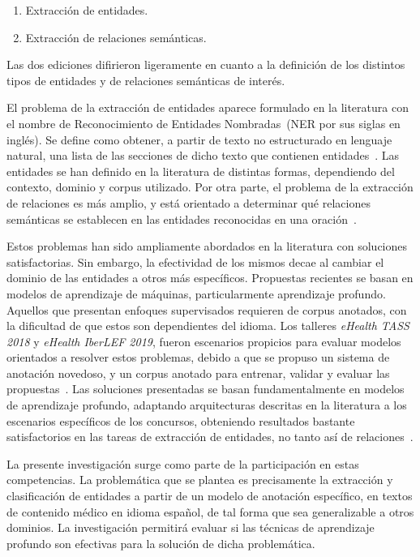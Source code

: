 \begin{enumerate}
	\item Extracción de entidades.
	\item Extracción de relaciones semánticas.
\end{enumerate}

Las dos ediciones difirieron ligeramente en cuanto a la definición de los distintos tipos de entidades y de relaciones semánticas de interés.

El problema de la extracción de entidades aparece formulado en la literatura con el nombre de Reconocimiento de Entidades Nombradas~(NER por sus siglas en inglés).
Se define como obtener, a partir de texto no estructurado en lenguaje natural, una lista de las secciones de dicho texto que contienen entidades~\cite{ehealthkd19_overview, nadeau2007survey}.
Las entidades se han definido en la literatura de distintas formas, dependiendo del contexto, dominio y corpus utilizado.
Por otra parte, el problema de la extracción de relaciones es más amplio, y está orientado a determinar qué relaciones semánticas se establecen en las entidades reconocidas en una oración~\cite{ehealthkd19_overview, kumar2017survey}.

Estos problemas han sido ampliamente abordados en la literatura con soluciones satisfactorias.
Sin embargo, la efectividad de los mismos decae al cambiar el dominio de las entidades a otros más específicos.
Propuestas recientes se basan en modelos de aprendizaje de máquinas, particularmente aprendizaje profundo.
Aquellos que presentan enfoques supervisados requieren de corpus anotados, con la dificultad de que estos son dependientes del idioma.
Los talleres \textit{eHealth TASS 2018} y \textit{eHealth IberLEF 2019}, fueron escenarios propicios para evaluar modelos orientados a resolver estos problemas, debido a que se propuso un sistema de anotación novedoso, y un corpus anotado para entrenar, validar y evaluar las propuestas~\cite{piad2019corpus}.
Las soluciones presentadas se basan fundamentalmente en modelos de aprendizaje profundo, adaptando arquitecturas descritas en la literatura a los escenarios específicos de los concursos, obteniendo resultados bastante satisfactorios en las tareas de extracción de entidades, no tanto así de relaciones~\cite{zavala2018hybrid, medina2018joint, lopez2018sinai, catala2019coin_flipper, alvarado2019uh, colon2019hulat, medina2019talp, lara2019lsi2}.

La presente investigación surge como parte de la participación en estas competencias.
La problemática que se plantea es precisamente la extracción y clasificación de entidades a partir de un modelo de anotación específico, en textos de contenido médico en idioma español, de tal forma que sea generalizable a otros dominios.
La investigación permitirá evaluar si las técnicas de aprendizaje profundo son efectivas para la solución de dicha problemática.


